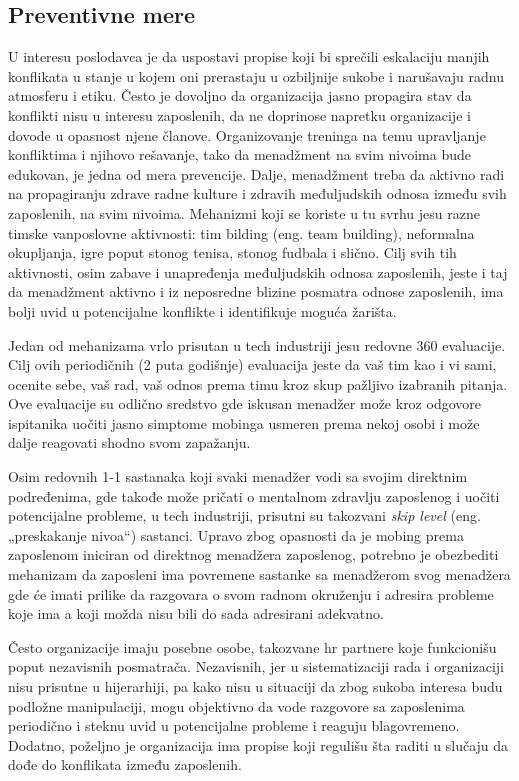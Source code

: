 \documentclass[a4paper]{article}
\newcommand{\quotes}[1]{„#1“}
\begin{document}
    \subsection{Preventivne mere}
    U interesu poslodavca je da uspostavi propise koji bi sprečili eskalaciju manjih konflikata u stanje u kojem oni prerastaju u ozbiljnije sukobe i narušavaju radnu atmosferu i etiku. Često je dovoljno da organizacija jasno propagira stav da konflikti nisu u interesu zaposlenih, da ne doprinose napretku organizacije i dovode u opasnost njene članove. Organizovanje treninga na temu upravljanje konfliktima i njihovo rešavanje, tako da menadžment na svim nivoima bude edukovan, je jedna od mera prevencije. Dalje, menadžment treba da aktivno radi na propagiranju zdrave radne kulture i zdravih međuljudskih odnosa između svih zaposlenih, na svim nivoima. Mehanizmi koji se koriste u tu svrhu jesu razne timske vanposlovne aktivnosti: tim bilding (eng. team building), neformalna okupljanja, igre poput stonog tenisa, stonog fudbala i slično. Cilj svih tih aktivnosti, osim zabave i unapređenja međuljudskih odnosa zaposlenih, jeste i taj da menadžment aktivno i iz neposredne blizine posmatra odnose zaposlenih, ima bolji uvid u potencijalne konflikte i identifikuje moguća žarišta.

    Jedan od mehanizama vrlo prisutan u tech industriji jesu redovne 360 evaluacije.
    Cilj ovih periodičnih (2 puta godišnje) evaluacija jeste da vaš tim kao i vi sami, ocenite sebe, vaš rad, vaš odnos prema timu kroz skup pažljivo izabranih pitanja. Ove evaluacije su odlično sredstvo gde iskusan menadžer može kroz odgovore ispitanika uočiti jasno simptome mobinga usmeren prema nekoj osobi i može dalje reagovati shodno svom zapažanju.

    Osim redovnih 1-1 sastanaka koji svaki menadžer vodi sa svojim direktnim podređenima, gde takođe može pričati o mentalnom zdravlju zaposlenog i uočiti potencijalne probleme, u tech industriji, prisutni su takozvani \textit{skip level} (eng. \quotes{preskakanje nivoa}) sastanci. Upravo zbog opasnosti da je mobing prema zaposlenom iniciran od direktnog menadžera zaposlenog, potrebno je obezbediti mehanizam da zaposleni ima povremene sastanke sa menadžerom svog menadžera gde će imati prilike da razgovara o svom radnom okruženju i adresira probleme koje ima a koji možda nisu bili do sada adresirani adekvatno.

    Često organizacije imaju posebne osobe, takozvane \acrshort{hr} partnere koje funkcionišu poput nezavisnih posmatrača. Nezavisnih, jer u sistematizaciji rada i organizaciji nisu prisutne u hijerarhiji, pa kako nisu u situaciji da zbog sukoba interesa budu podložne manipulaciji, mogu objektivno da vode razgovore sa zaposlenima periodično i steknu uvid u potencijalne probleme i reaguju blagovremeno. Dodatno, poželjno je organizacija ima propise koji regulišu šta raditi u slučaju da dođe do konflikata između zaposlenih.
\end{document}
